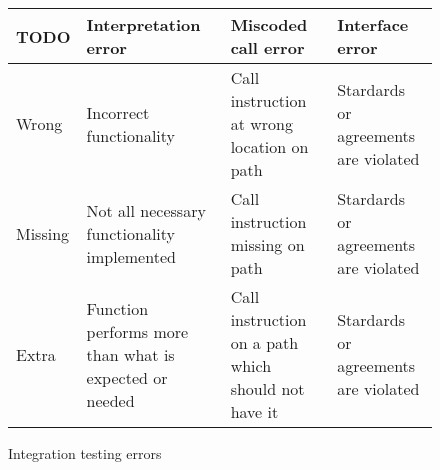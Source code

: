 \documentclass[12pt,a4paper,oneside,pdftex]{report}
\begin{document}
{{\begin{figure}[H]
\begin{center}
    \begin{tabular}{ l | p{3cm} | p{3cm} | p{3cm} }
    \hline
    TODO & Interpretation error & Miscoded call error & Interface error \\ \hline
    Wrong & Incorrect functionality & Call instruction at wrong location on path & Stardards or agreements are violated \\ \hline
    Missing & Not all necessary functionality implemented & Call instruction missing on path & Stardards or agreements are violated \\ 
    \hline
    Extra & Function performs more than what is expected or needed & Call instruction on a path which should not have it & Stardards or agreements are violated \\
    \hline
    \end{tabular}
\end{center}
\caption{Integration testing errors \citep{leung1990study}} \label{fig:errors}
\end{figure}

\begin{comment}
Interpretation
    wrong function - something else than specified
    extra function - more than what is expected/needed
    missing function - not all that is specified
Miscoded call (error which causes the developer to place the call instruction at the wrong point in the program)
    Extra instruction fault: the call instruction is on a path which should not have the call.
    Wrong placement fault: the call is at the wrong location on the path which should have the call instruction.
    Missing instruction fault: the call instruction is missing on the path which should have the call.
Interface error
    When stardards or agreements are violated
\end{comment}



\begin{comment}
% 

\end{comment}}}
\end{document}
